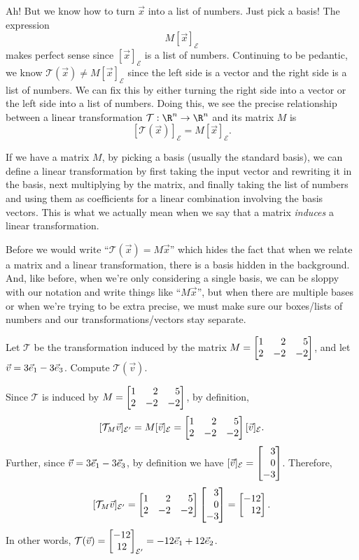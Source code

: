 Ah! But we know how to turn $\vec x$ into a list of numbers. Just pick a basis! The expression
\[
	M[\vec x]_{\mathcal E}
\]
makes perfect sense since $[\vec x]_{\mathcal E}$ is a list of numbers. Continuing to be pedantic, we know
$\mathcal T(\vec x)\neq M[\vec x]_{\mathcal E}$ since the left side is a vector and the right side is a list of numbers.
We can fix this by either turning the right side into a vector or the left side into a list of numbers.
Doing this, we see the precise relationship between a linear transformation $\mathcal T:\R^n\to\R^n$ and its matrix $M$ is
\[
	[\mathcal T(\vec x)]_{\mathcal E}=M[\vec x]_{\mathcal E}.
\]

If we have a matrix $M$, by picking a basis (usually the standard basis),
we can define a linear transformation by first taking the input vector and rewriting it in the basis,
next multiplying by the matrix, and finally taking the list of numbers and using them as coefficients
for a linear combination involving the basis vectors. This is what we actually mean
when we say that a matrix \emph{induces} a linear transformation.


Before we would write ``$\mathcal T(\vec x)=M\vec x$'' which hides the fact that when we relate a matrix and a linear
transformation, there is a basis hidden in the background. And, like before, when we're only considering a single basis,
we can be sloppy with our notation and write things like ``$M\vec x$'', but when there are multiple bases or when we're
trying to be extra precise, we must make sure our boxes/lists of numbers and our transformations/vectors stay separate.

\begin{example}
	Let $\mathcal T$ be the transformation induced by the matrix $M=\mat{1&2&5\\2&-2&-2}$,
	and let $\vec v=3{\vec e_1}-3{\vec e_3}$. Compute $\mathcal T(\vec v)$.

	Since $\mathcal T$ is induced by $M=\mat{1&2&5\\2&-2&-2}$, by definition, 	
	\[
	    [\mathcal T_{M}\vec v]_{\mathcal E'}= M[\vec v]_{\mathcal E}=\mat{1&2&5\\2&-2&-2}[\vec v]_{\mathcal E}.
	\]
	Further, since $\vec v=3{\vec e_1}-3{\vec e_3}$, by definition we have $[\vec v]_{\mathcal E}=\mat{3\\0\\-3}$. Therefore,
	\[
	    [\mathcal T_{M}\vec v]_{\mathcal E'}=\mat{1&2&5\\2&-2&-2}\mat{3\\0\\-3}=\mat{-12\\12}.
	\]
	In other words, $\mathcal T(\vec v) = \begin{bmatrix}-12\\12\end{bmatrix}_{\mathcal E'}=-12{\vec e_1}+12{\vec e_2}$.
\end{example}

